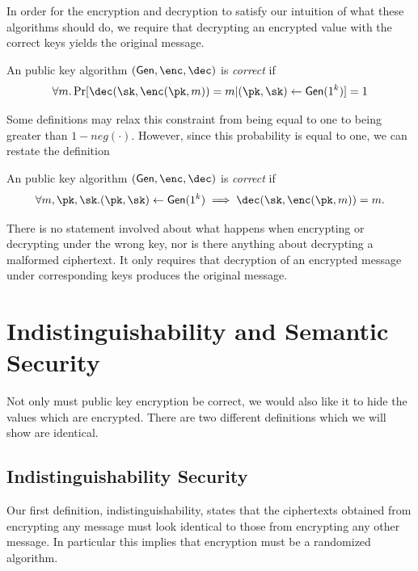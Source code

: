 \documentclass[12pt]{tufte-book}
\begin{document}
In order for the encryption and decryption to satisfy our intuition of what these
algorithms should do, we require that decrypting an encrypted value with the
correct keys yields the original message.

\begin{definition}[Correctness]
An public key algorithm $(\gen, \enc, \dec)$ is \emph{correct} if
\begin{equation*}
\forall m . \Pr[\dec(\sk, \enc(\pk, m))=m | (\pk,\sk) \gets \gen(1^k)] = 1
\end{equation*}
\end{definition}

Some definitions may relax this constraint from being equal to one to being greater
than $1-neg(\cdot)$. However, since this probability is equal to one, we can restate
the definition

\begin{lemma}[Correctness]
An public key algorithm $(\gen, \enc, \dec)$ is \emph{correct} if
\begin{equation*}
\forall m, \pk,\sk . (\pk,\sk) \gets \gen(1^k) \implies \dec(\sk, \enc(\pk, m))=m.
\end{equation*}
\end{lemma}

There is no statement involved about what happens when encrypting or decrypting
under the wrong key, nor is there anything about decrypting a malformed ciphertext.
It only requires that decryption of an encrypted message under corresponding
keys produces the original message.

\section{Indistinguishability and Semantic Security}

Not only must public key encryption be correct, we would also like it to hide
the values which are encrypted. There are two different definitions which we
will show are identical.

\subsection{Indistinguishability Security}
Our first definition, indistinguishability, states that the ciphertexts
obtained from encrypting any message must look identical to those from encrypting
any other message. In particular this implies that encryption must be a randomized
algorithm.
\end{document}
